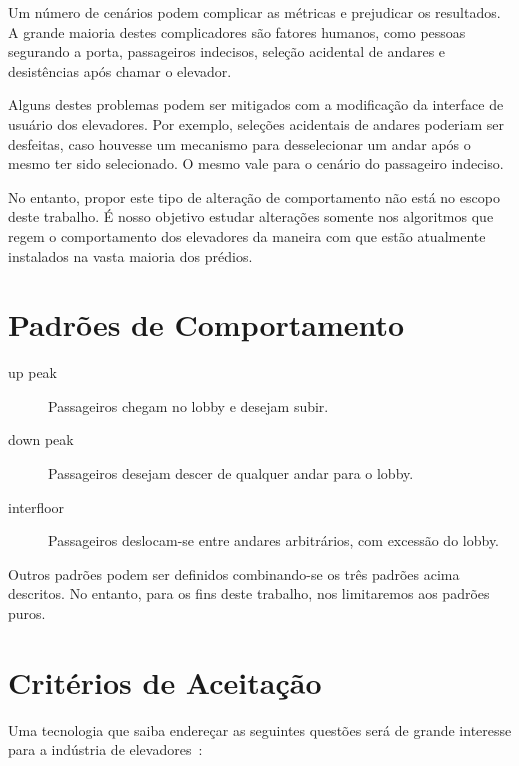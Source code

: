 Um número de cenários podem complicar as métricas e prejudicar os resultados. A
grande maioria destes complicadores são fatores humanos, como pessoas segurando
a porta, passageiros indecisos, seleção acidental de andares e desistências após
chamar o elevador.

Alguns destes problemas podem ser mitigados com a modificação da interface de
usuário dos elevadores. Por exemplo, seleções acidentais de andares poderiam ser
desfeitas, caso houvesse um mecanismo para desselecionar um andar após o mesmo
ter sido selecionado. O mesmo vale para o cenário do passageiro indeciso.

No entanto, propor este tipo de alteração de comportamento não está no escopo
deste trabalho. É nosso objetivo estudar alterações somente nos algoritmos que
regem o comportamento dos elevadores da maneira com que estão atualmente
instalados na vasta maioria dos prédios.

\section{Padrões de Comportamento}

\begin{description}
\item[up peak] Passageiros chegam no lobby e desejam subir.
\item[down peak] Passageiros desejam descer de qualquer andar para o lobby.
\item[interfloor] Passageiros deslocam-se entre andares arbitrários, com
  excessão do lobby.
\end{description}

Outros padrões podem ser definidos combinando-se os três padrões acima
descritos. No entanto, para os fins deste trabalho, nos limitaremos aos padrões puros.

\section{Critérios de Aceitação}

Uma tecnologia que saiba endereçar as seguintes questões será de grande interesse para a indústria de elevadores~\cite{KOEHLEROTTIGER02}:

